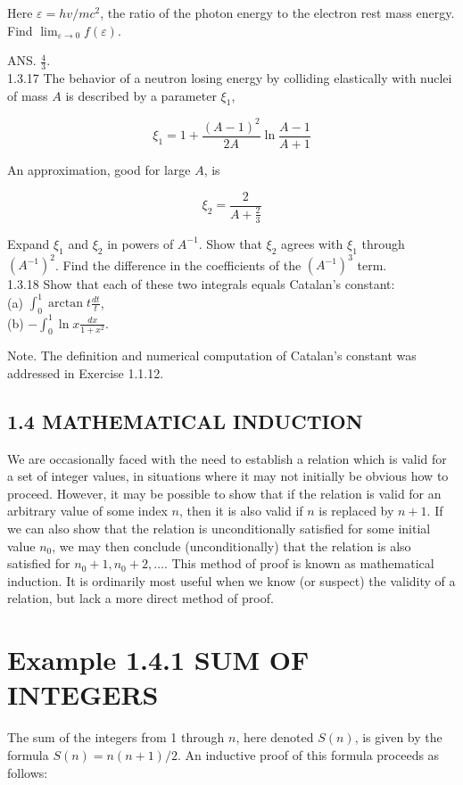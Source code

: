 \documentclass[10pt]{article}
\begin{document}
Here $\varepsilon=h v / m c^{2}$, the ratio of the photon energy to the electron rest mass energy. Find $\lim _{\varepsilon \rightarrow 0} f(\varepsilon)$.

ANS. $\frac{4}{3}$.\\
1.3.17 The behavior of a neutron losing energy by colliding elastically with nuclei of mass $A$ is described by a parameter $\xi_{1}$,

$$
\xi_{1}=1+\frac{(A-1)^{2}}{2 A} \ln \frac{A-1}{A+1}
$$

An approximation, good for large $A$, is

$$
\xi_{2}=\frac{2}{A+\frac{2}{3}}
$$

Expand $\xi_{1}$ and $\xi_{2}$ in powers of $A^{-1}$. Show that $\xi_{2}$ agrees with $\xi_{1}$ through $\left(A^{-1}\right)^{2}$. Find the difference in the coefficients of the $\left(A^{-1}\right)^{3}$ term.\\
1.3.18 Show that each of these two integrals equals Catalan's constant:\\
(a) $\int_{0}^{1} \arctan t \frac{d t}{t}$,\\
(b) $-\int_{0}^{1} \ln x \frac{d x}{1+x^{2}}$.

Note. The definition and numerical computation of Catalan's constant was addressed in Exercise 1.1.12.

\subsection*{1.4 MATHEMATICAL INDUCTION}
We are occasionally faced with the need to establish a relation which is valid for a set of integer values, in situations where it may not initially be obvious how to proceed. However, it may be possible to show that if the relation is valid for an arbitrary value of some index $n$, then it is also valid if $n$ is replaced by $n+1$. If we can also show that the relation is unconditionally satisfied for some initial value $n_{0}$, we may then conclude (unconditionally) that the relation is also satisfied for $n_{0}+1, n_{0}+2, \ldots$. This method of proof is known as mathematical induction. It is ordinarily most useful when we know (or suspect) the validity of a relation, but lack a more direct method of proof.

\section*{Example 1.4.1 SUM OF INTEGERS}
The sum of the integers from 1 through $n$, here denoted $S(n)$, is given by the formula $S(n)=n(n+1) / 2$. An inductive proof of this formula proceeds as follows:
\end{document}
